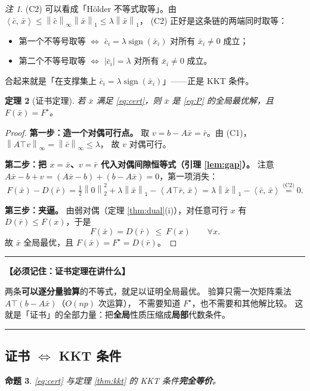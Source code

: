 \documentclass[11pt,a4paper,UTF8]{ctexart}
\theoremstyle{plain}
\newtheorem{theorem}{定理}[section]
\newtheorem{proposition}[theorem]{命题}
\theoremstyle{definition}
\theoremstyle{remark}
\newtheorem{remark}[theorem]{注}
\newcommand{\norm}[1]{\left\lVert #1 \right\rVert}
\newcommand{\abs}[1]{\left\lvert #1 \right\rvert}
\newcommand{\inner}[2]{\left\langle #1,\, #2 \right\rangle}
\DeclareMathOperator{\sign}{sign}
\newenvironment{keypoint}[1]
  {\par\medskip\noindent\begin{minipage}{\linewidth}%
   \hrule\smallskip\noindent\textbf{【必须记住：#1】}\par\nopagebreak\smallskip}
  {\smallskip\hrule\end{minipage}\medskip}
\begin{document}
\begin{remark}
(C2) 可以看成「Hölder 不等式取等」。由 $\inner{\bar c}{\bar x}\le\norm{\bar c}_\infty\norm{\bar x}_1\le\lambda\norm{\bar x}_1$，
(C2) 正好是这条链的两端同时取等：
\begin{itemize}
\item 第一个不等号取等 $\iff$ $\bar c_i=\lambda\sign(\bar x_i)$ 对所有 $\bar x_i\neq0$ 成立；
\item 第二个不等号取等 $\iff$ $\abs{\bar c_i}=\lambda$ 对所有 $\bar x_i\neq0$ 成立。
\end{itemize}
合起来就是「在支撑集上 $\bar c_i=\lambda\sign(\bar x_i)$」——正是 KKT 条件。
\end{remark}

\begin{theorem}[证书定理]\label{thm:cert}
若 $\bar x$ 满足 \eqref{eq:cert}，则 $\bar x$ 是 \eqref{eq:P} 的全局最优解，且 $F(\bar x)=F^\star$。
\end{theorem}

\begin{proof}
\textbf{第一步：造一个对偶可行点。}
取 $v=b-A\bar x=\bar r$。由 (C1)，$\norm{A\top v}_\infty=\norm{\bar c}_\infty\le\lambda$，
故 $v$ 对偶可行。

\textbf{第二步：把 $x=\bar x$、$v=\bar r$ 代入对偶间隙恒等式（引理 \ref{lem:gap}）。}
注意 $A\bar x-b+v=(A\bar x-b)+(b-A\bar x)=0$，第一项消失：
\[
F(\bar x)-D(\bar r)
=\tfrac12\norm{0}_2^2+\lambda\norm{\bar x}_1-\inner{A\top\bar r}{\bar x}
=\lambda\norm{\bar x}_1-\inner{\bar c}{\bar x}
\overset{\text{(C2)}}{=}0 .
\]

\textbf{第三步：夹逼。}
由弱对偶（定理 \ref{thm:dual}(i)），对任意可行 $x$ 有 $D(\bar r)\le F(x)$，于是
\[
F(\bar x)=D(\bar r)\ \le\ F(x)\qquad\forall x .
\]
故 $\bar x$ 全局最优，且 $F(\bar x)=F^\star=D(\bar r)$。
\end{proof}

\begin{keypoint}{证书定理在讲什么}
两条\textbf{可以逐分量验算}的不等式，就足以证明全局最优。
验算只需一次矩阵乘法 $A\top(b-A\bar x)$（$O(np)$ 次运算），
不需要知道 $F^\star$，也不需要和其他解比较。
这就是「证书」的全部力量：把\textbf{全局}性质压缩成\textbf{局部}代数条件。
\end{keypoint}

\subsection{证书 $\iff$ KKT 条件}

\begin{proposition}\label{prop:certkkt}
\eqref{eq:cert} 与定理 \ref{thm:kkt} 的 KKT 条件\textbf{完全等价}。
\end{proposition}
\end{document}
